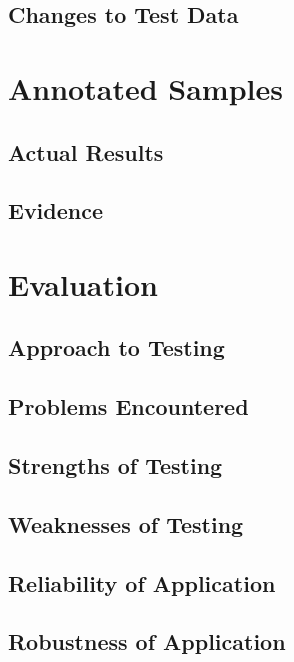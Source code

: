 \begin{landscape}
\subsection{Changes to Test Data}

\section{Annotated Samples}

\subsection{Actual Results}

\subsection{Evidence}

\end{landscape}

\section{Evaluation}

\subsection{Approach to Testing}

\subsection{Problems Encountered}

\subsection{Strengths of Testing}

\subsection{Weaknesses of Testing}

\subsection{Reliability of Application}

\subsection{Robustness of Application}